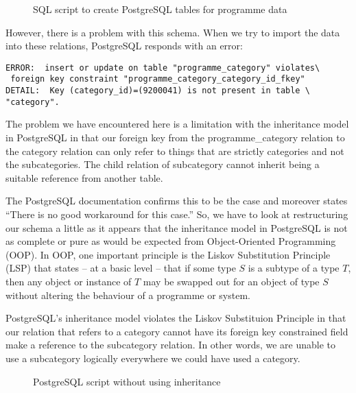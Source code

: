 \documentclass[11pt,a4paper]{article}
\begin{document}
\begin{figure}[p]
  
  \caption{SQL script to create PostgreSQL tables for programme data}
  \label{fig:create_table}
\end{figure}

However, there is a problem with this schema. When we try to import the
data into these relations, PostgreSQL responds with an error:

\begin{verbatim}
ERROR:  insert or update on table "programme_category" violates\
 foreign key constraint "programme_category_category_id_fkey"
DETAIL:  Key (category_id)=(9200041) is not present in table \
"category".
\end{verbatim}

The problem we have encountered here is a limitation with the
inheritance model in PostgreSQL in that our foreign key from the
programme\_category relation to the category relation can only refer to things
that are strictly categories and not the subcategories. The child relation
of subcategory cannot inherit being a suitable reference from another table.

The PostgreSQL documentation \cite{postgres-docs} confirms this to be the
case and moreover states ``There is no good workaround for this case.'' So,
we have to look at restructuring our schema a little as it appears that
the inheritance model in PostgreSQL is not as complete or pure as would
be expected from Object-Oriented Programming (OOP). In OOP, one important
principle is the Liskov Substitution Principle (LSP) that states -- at
a basic level -- that if some type $S$ is a subtype of a type $T$, then
any object or instance of $T$ may be swapped out for an object of
type $S$ without altering the behaviour of a programme or system.

PostgreSQL's inheritance model violates the Liskov Substituion Principle
in that our relation that refers to a category cannot have its foreign key
constrained field make a reference to the subcategory relation. In other
words, we are unable to use a subcategory logically everywhere we could
have used a category.

\begin{figure}[p]
  
  \caption{PostgreSQL script without using inheritance}
  \label{fig:flatten-category}
\end{figure}
\end{document}
